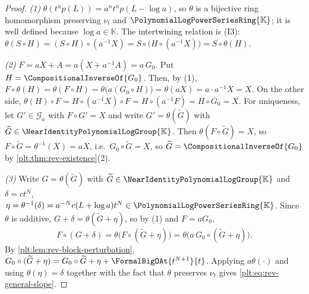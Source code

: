 \documentclass[11pt,oneside]{article}
\theoremstyle{plain}
\theoremstyle{definition}
\theoremstyle{remark}
\newcommand{\K}{\mathbb{K}}
\newcommand{\PLpow}{\PolynomialLogPowerSeriesRing{\K}}   %
\newcommand{\Gnear}{\NearIdentityPolynomialLogGroup{\K}} %
\newcommand{\ordt}{\nu_{t}}                              %
\newcommand{\compose}{\mathbin{\circ}}
\newcommand{\rev}[1]{\CompositionalInverseOf{#1}}
\begin{document}
\begin{proof}
\emph{(1)}  \(\theta(t^np(L))=a^nt^np(L-\log a)\), so \(\theta\) is a bijective
ring homomorphism preserving \(\ordt\) and \(\PLpow\); it is well defined
because \(\log a\in\K\).  The intertwining relation is (I3):
\(\theta(S\compose H)=(S\compose H)\compose(a^{-1}X)
=S\compose\bigl(H\compose(a^{-1}X)\bigr)=S\compose\theta(H)\).

\emph{(2)}  \(F=aX+A=a(X+a^{-1}A)=a\,G_0\).  Put \(H=\rev{G_0}\).  Then, by
(1), \(F\compose\theta(H)=\theta(F\compose H)=\theta\bigl(a(G_0\compose
H)\bigr)=\theta(aX)=a\cdot a^{-1}X=X\).  On the other side,
\(\theta(H)\compose F=H\compose(a^{-1}X)\compose F=H\compose(a^{-1}F)
=H\compose G_0=X\).  For uniqueness, let \(G'\in\mathcal G_a\) with
\(F\compose G'=X\) and write \(G'=\theta(\widetilde G)\) with
\(\widetilde G\in\Gnear\).  Then \(\theta(F\compose\widetilde G)=X\), so
\(F\compose\widetilde G=\theta^{-1}(X)=aX\), i.e.\
\(G_0\compose\widetilde G=X\), so \(\widetilde G=\rev{G_0}\) by
\cref{plt:thm:rev-existence}(2).

\emph{(3)}  Write \(G=\theta(\widetilde G)\) with \(\widetilde G\in\Gnear\) and
\(\delta=ct^N\), \(\eta=\theta^{-1}(\delta)=a^{-N}c(L+\log a)t^N\in\PLpow\).
Since \(\theta\) is additive, \(G+\delta=\theta(\widetilde G+\eta)\), so by (1)
and \(F=aG_0\),
\[
 F\compose(G+\delta)
 =\theta\bigl(F\compose(\widetilde G+\eta)\bigr)
 =\theta\bigl(a\,G_0\compose(\widetilde G+\eta)\bigr).
\]
By \cref{plt:lem:rev-block-perturbation},
\(G_0\compose(\widetilde G+\eta)=G_0\compose\widetilde G+\eta
+\FormalBigOAt{t^{N+1}}{t}\).  Applying \(a\theta(\cdot)\) and using
\(\theta(\eta)=\delta\) together with the fact that \(\theta\) preserves
\(\ordt\) gives \eqref{plt:eq:rev-general-slope}.
\end{proof}
\end{document}
